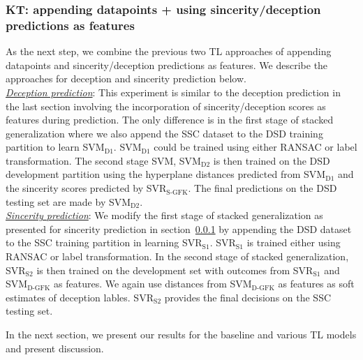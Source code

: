 \documentclass{article}
\begin{document}
\subsubsection{KT: appending datapoints + using sincerity/deception predictions as features}
As the next step, we combine the previous two TL approaches of appending datapoints and sincerity/deception predictions as features.
We describe the approaches for deception and sincerity prediction below.
\\

\noindent\underline{\it Deception prediction}: 
This experiment is similar to the deception prediction in the last section involving the incorporation of sincerity/deception scores as features during prediction.
The only difference is in the first stage of stacked generalization where we also append the SSC dataset to the DSD training partition to learn SVM$_\text{D1}$. 
SVM$_\text{D1}$ could be trained using either RANSAC or label transformation.
The second stage SVM, SVM$_\text{D2}$ is then trained on the DSD development partition using the hyperplane distances predicted from SVM$_\text{D1}$ and the sincerity scores predicted by SVR$_\text{S-GFK}$. 
The final predictions on the DSD testing set are made by SVM$_\text{D2}$.
\\

\noindent\underline{\it Sincerity prediction}:
We modify the first stage of stacked generalization as presented for sincerity prediction in section~\ref{} by appending the DSD dataset to the SSC training partition in learning SVR$_\text{S1}$.
SVR$_\text{S1}$ is trained either using RANSAC or label transformation. 
In the second stage of stacked generalization, SVR$_\text{S2}$ is then trained on the development set with outcomes from SVR$_\text{S1}$ and SVM$_\text{D-GFK}$ as features.
We again use distances from SVM$_\text{D-GFK}$ as features as soft estimates of deception lables. 
SVR$_\text{S2}$ provides the final decisions on the SSC testing set.

In the next section, we present our results for the baseline and various TL models and present discussion.
\end{document}
